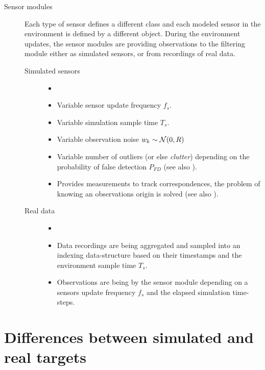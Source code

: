 \begin{description}
	\item[Sensor modules] Each type of sensor defines a different class and each modeled sensor in the environment is defined by a different object. During the environment updates, the sensor modules are providing observations to the filtering module either as simulated sensors, or from recordings of real data.
	\begin{description}
		\item[Simulated sensors]
		\begin{itemize}
			\item[]
			\item Variable sensor update frequency $f_s$.
			\item Variable simulation sample time $T_s$.
			\item Variable observation noise  ${w}_k \sim \mathcal{N}(0, {R})$
			\item Variable number of outliers (or else \emph{clutter}) depending on the probability of false detection $P_{FD}$ (see also ).
			\item Provides measurements to track correspondences, \ie the problem of knowing an observations origin is solved (see also ).
		\end{itemize}
		\item[Real data]
				\begin{itemize}
					\item[]
					\item Data recordings are being aggregated and sampled into an indexing data-structure based on their timestamps and the environment sample time $T_s$.
					\item Observations are being \textit{} by the sensor module depending on a sensors update frequency $f_s$ and the elapsed simulation time-steps.
				\end{itemize}
		
	\end{description}
\end{description}

	
	
\section{Differences between simulated and real targets}

